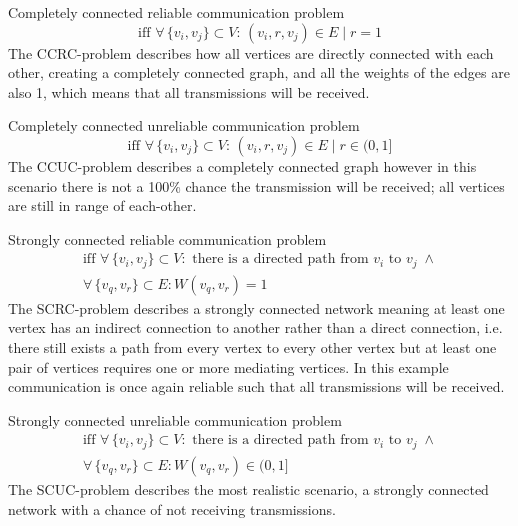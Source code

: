 \begin{description}[itemsep=2em]
    \item[CCRC-problem:] Completely connected reliable communication problem   
    \begin{equation}
    \text{iff } \forall\, \{v_i, v_j\} \subset V: \, (v_i,r,v_j)\in E \mid r = 1    
    \end{equation}
    The CCRC-problem describes how all vertices are directly connected with each other, creating a completely connected graph, and all the weights of the edges are also 1, which means that all transmissions will be received. 
    
    \item[CCUC-problem:] Completely connected unreliable communication problem
    \begin{equation}
    \text{iff } \forall\, \{v_i, v_j\} \subset V: \, (v_i,r,v_j)\in E \mid r \in (0, 1]
    \end{equation}
    The CCUC-problem describes a completely connected graph however in this scenario there is not a 100\% chance the transmission will be received; all vertices are still in range of each-other. 
    
    \item[SCRC-problem:] Strongly connected reliable communication problem
    \begin{equation}
    \begin{gathered}
    \text{iff } \forall\, \{v_i, v_j\} \subset V: \text{ there is a directed path from } v_i \text{ to } v_j\; \land \\ \forall\, \{v_q, v_r\} \subset E : W(v_q, v_r) = 1
    \end{gathered}  
    \end{equation}   
    The SCRC-problem describes a strongly connected network meaning at least one vertex has an indirect connection to another rather than a direct connection, i.e. there still exists a path from every vertex to every other vertex but at least one pair of vertices requires one or more mediating vertices. In this example communication is once again reliable such that all transmissions will be received. 
    
    \item[SCUC-problem:] Strongly connected unreliable communication problem
    \begin{equation}
    \begin{gathered}
    \text{iff } \forall\, \{v_i, v_j\} \subset V: \text{ there is a directed path from } v_i \text{ to } v_j\; \land \\ \forall\, \{v_q, v_r\} \subset E : W(v_q, v_r) \in (0, 1]
    \end{gathered}  
    \end{equation}    
    The SCUC-problem describes the most realistic scenario, a strongly connected network with a chance of not receiving transmissions. 
\end{description}
